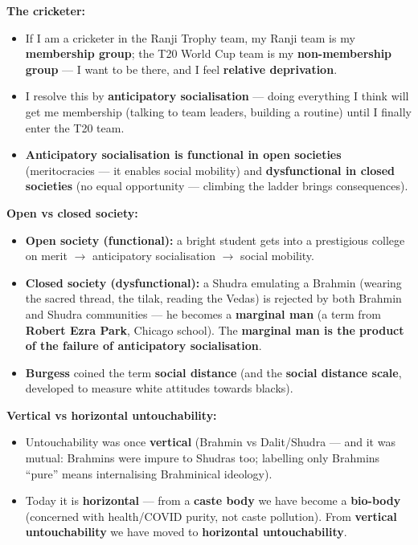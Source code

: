 \begin{ExampleBox}
\textbf{The cricketer:}
\begin{itemize}
\item If I am a cricketer in the Ranji Trophy team, my Ranji team is my \textbf{membership group}; the T20 World Cup team is my \textbf{non-membership group} --- I want to be there, and I feel \textbf{relative deprivation}.
\item I resolve this by \textbf{anticipatory socialisation} --- doing everything I think will get me membership (talking to team leaders, building a routine) until I finally enter the T20 team.
\end{itemize}
\end{ExampleBox}

\begin{KeyConcept}
\begin{itemize}
\item \textbf{Anticipatory socialisation is functional in open societies} (meritocracies --- it enables social mobility) and \textbf{dysfunctional in closed societies} (no equal opportunity --- climbing the ladder brings consequences).
\end{itemize}
\end{KeyConcept}

\begin{ExampleBox}
\textbf{Open vs closed society:}
\begin{itemize}
\item \textbf{Open society (functional):} a bright student gets into a prestigious college on merit $\rightarrow$ anticipatory socialisation $\rightarrow$ social mobility.
\item \textbf{Closed society (dysfunctional):} a Shudra emulating a Brahmin (wearing the sacred thread, the tilak, reading the Vedas) is rejected by both Brahmin and Shudra communities --- he becomes a \textbf{marginal man} (a term from \textbf{Robert Ezra Park}, Chicago school). The \textbf{marginal man is the product of the failure of anticipatory socialisation}.
\item \textbf{Burgess} coined the term \textbf{social distance} (and the \textbf{social distance scale}, developed to measure white attitudes towards blacks).
\end{itemize}
\end{ExampleBox}

\begin{CriticalPoint}
\textbf{Vertical vs horizontal untouchability:}
\begin{itemize}
\item Untouchability was once \textbf{vertical} (Brahmin vs Dalit/Shudra --- and it was mutual: Brahmins were impure to Shudras too; labelling only Brahmins ``pure'' means internalising Brahminical ideology).
\item Today it is \textbf{horizontal} --- from a \textbf{caste body} we have become a \textbf{bio-body} (concerned with health/COVID purity, not caste pollution). From \textbf{vertical untouchability} we have moved to \textbf{horizontal untouchability}.
\end{itemize}
\end{CriticalPoint}

